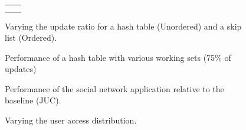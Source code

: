 \documentclass{article}
\begin{document}
    \begin{figure}
        \hspace{-8.8em}
        \begin{tabular}[t]{c c}
            \begin{tikzpicture}
                
            \end{tikzpicture}
            &
            \begin{tikzpicture}
                
            \end{tikzpicture}
            \\
            \begin{tikzpicture}
                
            \end{tikzpicture}
            &
            \begin{tikzpicture}
                
            \end{tikzpicture}
            \\
        \end{tabular}
        \caption{
            Varying the update ratio for a hash table (Unordered) and a skip list (Ordered).
        }
    \end{figure}

    \begin{figure}
        \begin{tikzpicture}
            
        \end{tikzpicture}
        \vspace{-1em}%
        \caption{Performance of a hash table with various working sets (75\% of updates)}
        \vspace{-1em}%
    \end{figure}

    \begin{figure}
        
        \caption{
            Performance of the social network application relative to the baseline (JUC).
        }
    \end{figure}

    \begin{figure}
        
        \caption{
            Varying the user access distribution.
        }
    \end{figure}
\end{document}
